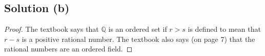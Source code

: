 \documentclass[11pt]{article}
\begin{document}
    \subsection{Solution (b)}
    \begin{proof}
        The textbook says that $\mathbb{Q}$ is an ordered set if $r > s$ is defined to mean that $r - s$ is a positive rational number.
        The textbook also says (on page 7) that the rational numbers are an ordered field.




\end{proof}
\end{document}
